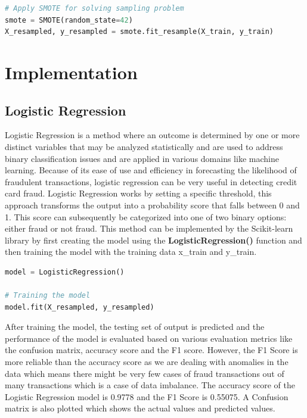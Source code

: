 \begin{lstlisting}[language=Python, caption={Creating and training Catboost model}, label=list:python_code_ex]
# Apply SMOTE for solving sampling problem
smote = SMOTE(random_state=42)
X_resampled, y_resampled = smote.fit_resample(X_train, y_train)
\end{lstlisting}

 
 



\section{Implementation}
\subsection{Logistic Regression}
 Logistic Regression is a method where an outcome is determined by one or more distinct variables that may be analyzed statistically and are used to address binary classification issues and are applied in various domains like machine learning. Because of its ease of use and efficiency in forecasting the likelihood of fraudulent transactions, logistic regression can be very useful in detecting credit card fraud. Logistic Regression works by setting a specific threshold, this approach transforms the output into a probability score that falls between 0 and 1. This score can subsequently be categorized into one of two binary options: either fraud or not fraud. This method can be implemented by the Scikit-learn library by first creating the model using the \textbf{LogisticRegression()} function and then training the model with the training data x\_train and y\_train.

\begin{lstlisting}[language=Python, caption={Code snippet in \LaTeX ~and  this is a Python code example}, label=list:python_code_ex]
model = LogisticRegression()

# Training the model
model.fit(X_resampled, y_resampled)
\end{lstlisting}
 

 
After training the model, the testing set of output is predicted and the performance of the model is evaluated based on various evaluation metrics like the confusion matrix, accuracy score and the F1 score. However, the F1 Score is more reliable than the accuracy score as we are dealing with anomalies in the data which means there might be very few cases of fraud transactions out of many transactions which is a case of data imbalance. The accuracy score of the Logistic Regression model is 0.9778 and the F1 Score is 0.55075. A Confusion matrix is also plotted which shows the actual values and predicted values. 






